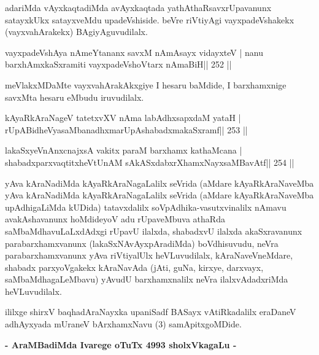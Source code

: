 \begin{artha}
adariMda vAyxkaqtadiMda avAyxkaqtada yathAthaRsavxrUpavanunx satayxkUkx satayxveMdu upadeVshiside. beVre riVtiyAgi vayxpadeVshakekx (vayxvahArakekx) BAgiyAguvudilalx.
\end{artha}

\begin{shl}
vayxpadeVshAya nAmeYtananx savxM nAmAsayx vidayxteV |
nanu barxhAmxkaSxramiti vayxpadeVshoV\s tarx nAmaBiH\hfill || 252 ||
\end{shl}

\begin{artha}
meVlakxMDaMte vayxvahArakAkxgiye I hesaru baMdide, I barxhamxnige
savxMta hesaru eMbudu iruvudilalx. 
\end{artha}


\begin{shl}
kAyaRkAraNageV tatetxvXV nAma labAdhxsapxdaM yataH |
rUpABidheVyasaMbanadhxmarUpAshabadxmakaSxramf\hfill || 253 ||
\end{shl}

\begin{shl}
lakaSxyeVnAnxcnajxsA vakitx paraM barxhamx kathaMcana |
shabadxparxvaqtitxheVtUnAM sAkASxdabxrXhamxNayxsaMBavAtf\hfill || 254 ||
\end{shl}

\begin{artha}
yAva kAraNadiMda kAyaRkAraNagaLalilx seVrida (aMdare kAyaRkAraNaveMba
yAva kAraNadiMda kAyaRkAraNagaLalilx seVrida (aMdare kAyaRkAraNaveMba
upAdhigaLiMda kUDida) tatavxdalilx soVpAdhika-vasutxvinalilx nAmavu
avakAshavanunx hoMdideyoV adu rUpaveMbuva athaRda
saMbaMdhavuLaLxdAdxgi rUpavU ilalxda, shabadxvU ilalxda akaSxravanunx
parabarxhamxvanunx (lakaSxNAvAyxpAradiMda) boVdhisuvudu, neVra
parabarxhamxvanunx yAva riVtiyalUlx heVLuvudilalx, kAraNaveVneMdare,
shabadx parxyoVgakekx kAraNavAda (jAti, guNa, kirxye, darxvayx,
saMbaMdhagaLeMbavu) yAvudU barxhamxnalilx neVra ilalxvAdadxriMda
heVLuvudilalx.
\end{artha}

\begin{center}
ililxge shirxV baqhadAraNayxka upaniSadf BASayx vAtiRkadalilx eraDaneV
adhAyxyada mUraneV bArxhamxNavu (3) samApitxgoMDide.
\end{center}

\begin{center}
\textbf{- AraMBadiMda Ivarege oTuTx 4993 sholxVkagaLu -}
\end{center}

